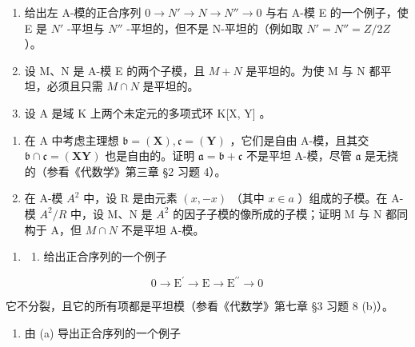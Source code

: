 
\begin{enumerate}
\def\labelenumi{\arabic{enumi}.}
\item
  给出左 A-模的正合序列 \(0 \rightarrow N' \rightarrow N \rightarrow N'' \rightarrow 0\) 与右 A-模 E 的一个例子，使 E 是 \(N'\) -平坦与 \(N''\) -平坦的，但不是 N-平坦的（例如取 \(N' = N'' = Z/2Z\) ）。
\item
  设 M、N 是 A-模 E 的两个子模，且 \(M + N\) 是平坦的。为使 M 与 N 都平坦，必须且只需 \(M \cap N\) 是平坦的。
\item
  设 A 是域 K 上两个未定元的多项式环 K{[}X, Y{]} 。
\end{enumerate}

\begin{enumerate}
\def\labelenumi{(\alph{enumi})}
\item
  在 A 中考虑主理想 \(\mathfrak{b} = (\mathbf{X}), \mathfrak{c} = (\mathbf{Y})\) ，它们是自由 A-模，且其交 \(\mathfrak{b} \cap \mathfrak{c} = (\mathbf{XY})\) 也是自由的。证明 \(\mathfrak{a} = \mathfrak{b} + \mathfrak{c}\) 不是平坦 A-模，尽管 \(\mathfrak{a}\) 是无挠的（参看《代数学》第三章 §2 习题 4）。
\item
  在 A-模 \(A^{2}\) 中，设 R 是由元素 \((x, -x)\) （其中 \(x \in a\) ）组成的子模。在 A-模 \(A^{2}/R\) 中，设 M、N 是 \(A^{2}\) 的因子子模的像所成的子模；证明 M 与 N 都同构于 A，但 \(M \cap N\) 不是平坦 A-模。
\end{enumerate}

\begin{enumerate}
\def\labelenumi{\arabic{enumi}.}
\setcounter{enumi}{3}
\tightlist
\item
  \begin{enumerate}
  \def\labelenumii{(\alph{enumii})}
  \tightlist
  \item
    给出正合序列的一个例子
  \end{enumerate}
\end{enumerate}

\[
0 \rightarrow \mathrm{E} ^ {\prime} \rightarrow \mathrm{E} \rightarrow \mathrm{E} ^ {\prime \prime} \rightarrow 0
\]

它不分裂，且它的所有项都是平坦模（参看《代数学》第七章 §3 习题 8 (b)）。

\begin{enumerate}
\def\labelenumi{(\alph{enumi})}
\setcounter{enumi}{1}
\tightlist
\item
  由 (a) 导出正合序列的一个例子
\end{enumerate}

